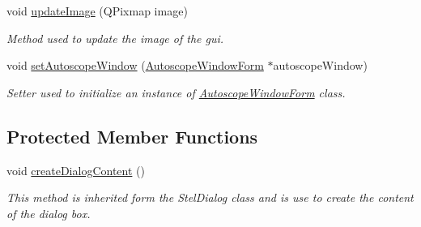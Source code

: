 \begin{DoxyCompactItemize}
void \mbox{\hyperlink{class_autoscope_picture_window_form_ac5673825fbee28ceaa21d962b92fbd42}{update\+Image}} (Q\+Pixmap image)
\begin{DoxyCompactList}\small\item\em Method used to update the image of the gui. \end{DoxyCompactList}\item 
void \mbox{\hyperlink{class_autoscope_picture_window_form_a14928e7fe4954367986932b7439fa132}{set\+Autoscope\+Window}} (\mbox{\hyperlink{class_autoscope_window_form}{Autoscope\+Window\+Form}} $\ast$autoscope\+Window)
\begin{DoxyCompactList}\small\item\em Setter used to initialize an instance of \mbox{\hyperlink{class_autoscope_window_form}{Autoscope\+Window\+Form}} class. \end{DoxyCompactList}\end{DoxyCompactItemize}
\subsection*{Protected Member Functions}
\begin{DoxyCompactItemize}
\item 
void \mbox{\hyperlink{class_autoscope_picture_window_form_a3014c48f6c7e48455f8908ca3f9acbbc}{create\+Dialog\+Content}} ()
\begin{DoxyCompactList}\small\item\em This method is inherited form the Stel\+Dialog class and is use to create the content of the dialog box. \end{DoxyCompactList}\end{DoxyCompactItemize}
